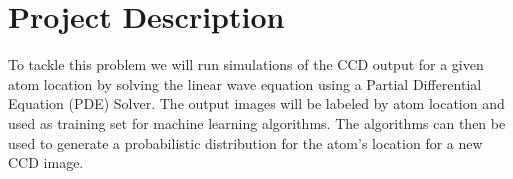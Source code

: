 \section{Project Description}
To tackle this problem we will run simulations of the CCD output for a given atom location by solving the linear wave equation using a Partial Differential Equation (PDE) Solver.  The output images will be labeled by atom location and used as training set for machine learning algorithms.  The algorithms can then be used to generate a probabilistic distribution for the atom's location for a new CCD image.




